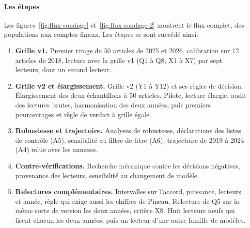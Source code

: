 \paragraph{Les étapes}
Les figures~\ref{fig:flux-sondage} et~\ref{fig:flux-sondage-2} montrent le flux complet, des populations aux comptes finaux. Les étapes se
sont succédé ainsi.
\begin{enumerate}
  \item \textbf{Grille v1.} Premier tirage de 50 articles de 2025 et 2026, calibration sur 12 articles
  de 2018, lecture avec la grille v1 (Q1 à Q8, X1 à X7) par sept lecteurs, dont un second lecteur.
  \item \textbf{Grille v2 et élargissement.} Grille v2 (Y1 à Y12) et ses règles de décision.
  Élargissement des deux échantillons à 50 articles. Pilote, lecture élargie, audit des lectures
  brutes, harmonisation des deux années, puis premiers pourcentages et règle de verdict à grille égale.
  \item \textbf{Robustesse et trajectoire.} Analyses de robustesse, déclarations des listes de contrôle
  (A5), sensibilité au filtre de titre (A6), trajectoire de 2019 à 2024 (A4) relue avec les annexes.
  \item \textbf{Contre-vérifications.} Recherche mécanique contre les décisions négatives, provenance
  des lecteurs, sensibilité au changement de modèle.
  \item \textbf{Relectures complémentaires.} Intervalles sur l'accord, puissance, lecteurs et année,
  règle qui exige aussi les chiffres de Pineau. Relecture de Q5 sur la même sorte de version les deux
  années, critère X8. Huit lecteurs neufs qui lisent chacun les deux années, puis un lecteur d'une
  autre famille de modèles.
\end{enumerate}



